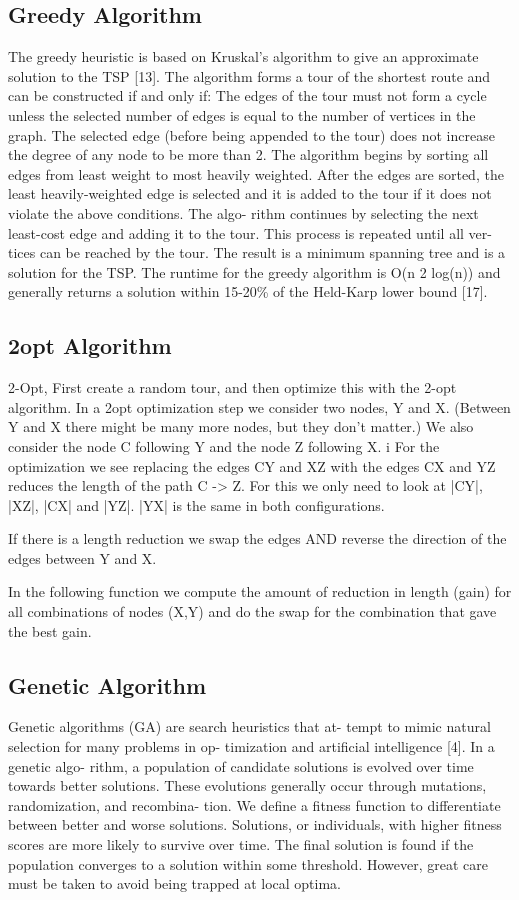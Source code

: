 \documentclass[10pt,twocolumn,letterpaper]{article}
\begin{document}
\subsection{Greedy Algorithm}
The greedy heuristic is based on Kruskal’s algorithm to
give an approximate solution to the TSP [13]. The algorithm
forms a tour of the shortest route and can be constructed if
and only if:
The edges of the tour must not form a cycle unless
the selected number of edges is equal to the number of
vertices in the graph.
The selected edge (before being appended to the tour)
does not increase the degree of any node to be more
than 2.
The algorithm begins by sorting all edges from least weight
to most heavily weighted. After the edges are sorted, the
least heavily-weighted edge is selected and it is added to the
tour if it does not violate the above conditions. The algo-
rithm continues by selecting the next least-cost edge and
adding it to the tour. This process is repeated until all ver-
tices can be reached by the tour. The result is a minimum
spanning tree and is a solution for the TSP. The runtime for
the greedy algorithm is O(n 2 log(n)) and generally returns a
solution within 15-20\% of the Held-Karp lower bound [17].

\subsection{2opt Algorithm}
2-Opt, First create a random tour, and then optimize this with the 2-opt
algorithm. 
In a 2opt optimization step we consider two nodes, Y and X.  (Between Y
and X there might be many more nodes, but they don't matter.) We also
consider the node C following Y and the node Z following X. i
For the optimization we see replacing the edges CY and XZ with the edges CX
and YZ reduces the length of the path  C -> Z.  For this we only need to
look at |CY|, |XZ|, |CX| and |YZ|.   |YX| is the same in both
configurations.

If there is a length reduction we swap the edges AND reverse the direction
of the edges between Y and X.
 
In the following function we compute the amount of reduction in length
(gain) for all combinations of nodes (X,Y) and do the swap for the
combination that gave the best gain.
 

\subsection{Genetic Algorithm}
Genetic algorithms (GA) are search heuristics that at-
tempt to mimic natural selection for many problems in op-
timization and artificial intelligence [4]. In a genetic algo-
rithm, a population of candidate solutions is evolved over
time towards better solutions. These evolutions generally
occur through mutations, randomization, and recombina-
tion. We define a fitness function to differentiate between
better and worse solutions. Solutions, or individuals, with
higher fitness scores are more likely to survive over time.
The final solution is found if the population converges to a
solution within some threshold. However, great care must
be taken to avoid being trapped at local optima.
\end{document}
